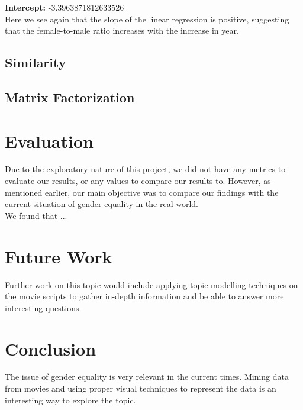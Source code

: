 \documentclass[12pt]{article}
\begin{document}
\textbf{Intercept:} -3.3963871812633526 \\

Here we see again that the slope of the linear regression is positive, suggesting that the female-to-male ratio increases with the increase in year.

\subsection{Similarity}

\subsection{Matrix Factorization}


\section{Evaluation}
Due to the exploratory nature of this project, we did not have any metrics to evaluate our results, or any values to compare our results to. However, as mentioned earlier, our main objective was to compare our findings with the current situation of gender equality in the real world. \\

We found that ...

\section{Future Work}
Further work on this topic would include applying topic modelling techniques on the movie scripts to gather in-depth information and be able to answer more interesting questions. 

\section{Conclusion}
The issue of gender equality is very relevant in the current times. Mining data from movies and using proper visual techniques to represent the data is an interesting way to explore the topic.



\end{document}
